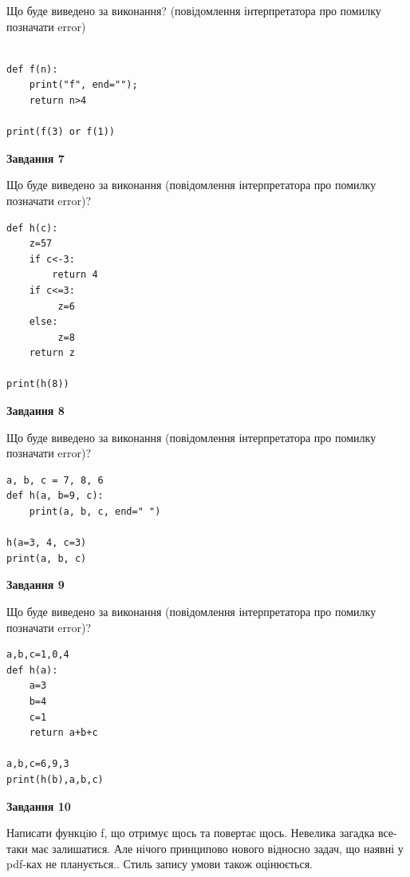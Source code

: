 \documentclass[12pt, ukrainian]{article}
\begin{document}
{\begin {large}
Що буде виведено за виконання? (повідомлення інтерпретатора про помилку позначати error)\par
\begin{verbatim}

def f(n):
    print("f", end="");
    return n>4

print(f(3) or f(1))
\end{verbatim}

{\begin {center}\textbf{Завдання 7}\end {center}}

Що буде виведено за виконання (повідомлення інтерпретатора про помилку позначати error)?\par
\begin{verbatim}
def h(c):
    z=57
    if c<-3: 
        return 4
    if c<=3:
         z=6
    else:
         z=8
    return z

print(h(8))
\end{verbatim}

{\begin {center}\textbf{Завдання 8}\end {center}}

Що буде виведено за виконання (повідомлення інтерпретатора про помилку позначати error)?\par
\begin{verbatim}
a, b, c = 7, 8, 6
def h(a, b=9, c):
    print(a, b, c, end=" ")

h(a=3, 4, c=3)
print(a, b, c)
\end{verbatim}

{\begin {center}\textbf{Завдання 9}\end {center}}

Що буде виведено за виконання (повідомлення інтерпретатора про помилку позначати error)?\par
\begin{verbatim}
a,b,c=1,0,4
def h(a):
    a=3
    b=4
    c=1
    return a+b+c

a,b,c=6,9,3
print(h(b),a,b,c)
\end{verbatim}

{\begin {center}\textbf{Завдання 10}\end {center}}


Написати функцiю f, що отримує щось та повертає щось. Невелика загадка все-таки має залишатися. Але нічого принципово нового відносно задач, що наявні у pdf-ках не планується.. Стиль запису умови також оцінюється.\par
\end {large}}
\newpage
\end{document}
